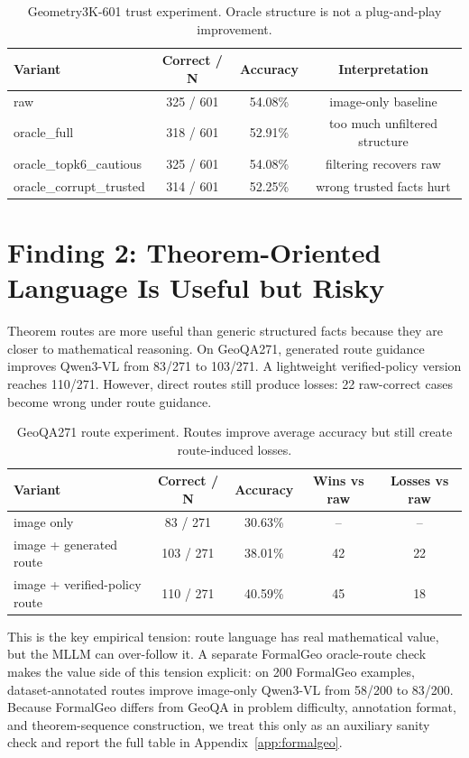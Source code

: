 \documentclass[11pt]{article}
\begin{document}
\begin{table}[t]
\centering
\caption{Geometry3K-601 trust experiment. Oracle structure is not a plug-and-play improvement.}
\label{tab:trust601}
\small
\begin{tabular}{lccc}
\toprule
Variant & Correct / N & Accuracy & Interpretation \\
\midrule
raw & 325 / 601 & 54.08\% & image-only baseline \\
oracle\_full & 318 / 601 & 52.91\% & too much unfiltered structure \\
oracle\_topk6\_cautious & 325 / 601 & 54.08\% & filtering recovers raw \\
oracle\_corrupt\_trusted & 314 / 601 & 52.25\% & wrong trusted facts hurt \\
\bottomrule
\end{tabular}
\end{table}

\section{Finding 2: Theorem-Oriented Language Is Useful but Risky}
Theorem routes are more useful than generic structured facts because they are closer to mathematical reasoning. On GeoQA271, generated route guidance improves Qwen3-VL from 83/271 to 103/271. A lightweight verified-policy version reaches 110/271. However, direct routes still produce losses: 22 raw-correct cases become wrong under route guidance.

\begin{table}[t]
\centering
\caption{GeoQA271 route experiment. Routes improve average accuracy but still create route-induced losses.}
\label{tab:geoqa271}
\small
\begin{tabular}{lcccc}
\toprule
Variant & Correct / N & Accuracy & Wins vs raw & Losses vs raw \\
\midrule
image only & 83 / 271 & 30.63\% & -- & -- \\
image + generated route & 103 / 271 & 38.01\% & 42 & 22 \\
image + verified-policy route & 110 / 271 & 40.59\% & 45 & 18 \\
\bottomrule
\end{tabular}
\end{table}

This is the key empirical tension: route language has real mathematical value, but the MLLM can over-follow it. A separate FormalGeo oracle-route check makes the value side of this tension explicit: on 200 FormalGeo examples, dataset-annotated routes improve image-only Qwen3-VL from 58/200 to 83/200. Because FormalGeo differs from GeoQA in problem difficulty, annotation format, and theorem-sequence construction, we treat this only as an auxiliary sanity check and report the full table in Appendix~\ref{app:formalgeo}.
\end{document}
